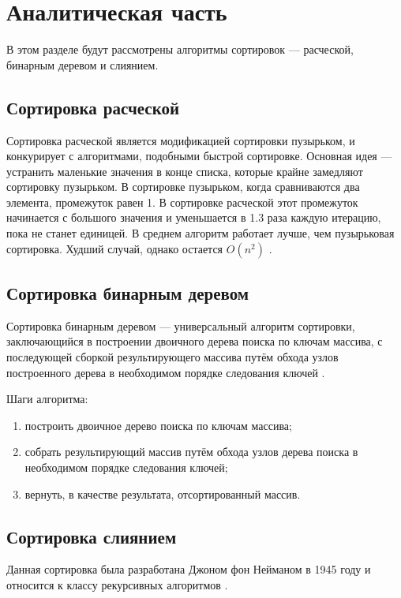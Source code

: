 \chapter{Аналитическая часть}
В этом разделе будут рассмотрены алгоритмы сортировок --- расческой, бинарным деревом и слиянием.

\section{Сортировка расческой}
Сортировка расческой является модификацией сортировки пузырьком, и конкурирует с алгоритмами, подобными быстрой сортировке. Основная идея --- устранить маленькие значения в конце списка, которые крайне замедляют сортировку пузырьком. В сортировке пузырьком, когда сравниваются два элемента, промежуток равен 1. В сортировке расческой этот промежуток начинается с большого значения и уменьшается в 1.3 раза каждую итерацию, пока не станет единицей. В среднем алгоритм работает лучше, чем пузырьковая сортировка. Худший случай, однако остается $O(n^2)$ \cite{comb}.

\section{Сортировка бинарным деревом}

Сортировка бинарным деревом --- универсальный алгоритм сортировки, заключающийся в построении двоичного дерева поиска по ключам массива, с последующей сборкой результирующего массива путём обхода узлов построенного дерева в необходимом порядке следования ключей \cite{Knut}.

Шаги алгоритма:
\begin{enumerate}[label=\arabic*)]
	\item построить двоичное дерево поиска по ключам массива;
	\item собрать результирующий массив путём обхода узлов дерева поиска в необходимом порядке следования ключей;
	\item вернуть, в качестве результата, отсортированный массив.
\end{enumerate}

\section{Сортировка слиянием}
Данная сортировка была разработана Джоном фон Нейманом в 1945 году и относится к классу рекурсивных алгоритмов \cite{algos}. 


